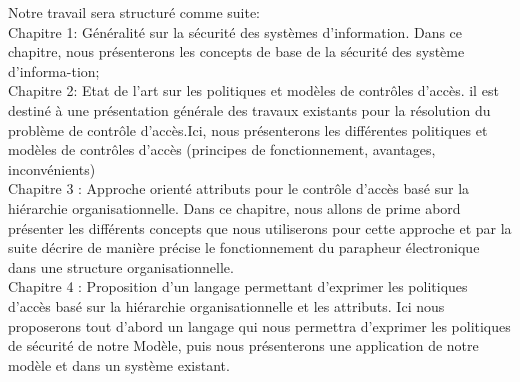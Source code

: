 Notre travail sera structuré comme suite: \\
\hspace*{0.5cm} Chapitre 1: Généralité sur la sécurité des systèmes d'information. Dans ce chapitre, nous présenterons les concepts de base de la sécurité des système d'informa-tion; \\
\hspace*{0.5cm} Chapitre 2: Etat de l'art sur les politiques et modèles de contrôles d'accès. il est destiné à une présentation générale des travaux existants pour la résolution du problème de contrôle d'accès.Ici, nous présenterons les différentes politiques et modèles de contrôles d'accès (principes de fonctionnement, avantages, inconvénients)\\
\hspace*{0.5cm} Chapitre 3 : Approche orienté attributs pour le contrôle d'accès basé sur la hiérarchie organisationnelle. Dans ce chapitre, nous allons de prime abord présenter les différents concepts que nous utiliserons pour cette approche et par la suite décrire de manière précise le fonctionnement du parapheur électronique dans une structure organisationnelle.\\
\hspace*{0.5cm} Chapitre 4 : Proposition d'un langage permettant d'exprimer les politiques d'accès basé sur la hiérarchie organisationnelle et les attributs. Ici nous proposerons tout d'abord un langage qui nous permettra d'exprimer les politiques de sécurité de notre Modèle, puis nous présenterons une application de notre modèle et dans un système existant.





\myCleanStarChapterEnd
